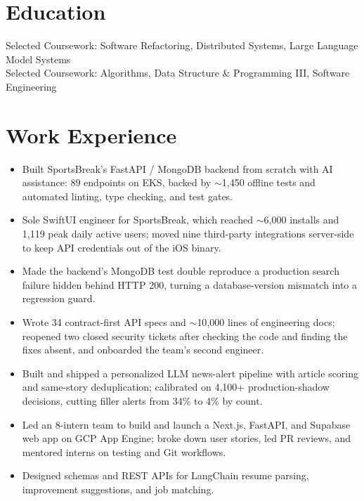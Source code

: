 \documentclass[11pt, letterpaper]{article}
\begin{document}

\section{Education}
Selected Coursework: Software Refactoring, Distributed Systems, Large Language Model Systems\\[1pt]
Selected Coursework: Algorithms, Data Structure \& Programming III, Software Engineering

\section{Work Experience}
\begin{itemize}
  \item Built SportsBreak's FastAPI / MongoDB backend from scratch with AI assistance: 89 endpoints on EKS, backed by $\sim$1{,}450 offline tests and automated linting, type checking, and test gates.
  \item Sole SwiftUI engineer for SportsBreak, which reached $\sim$6{,}000 installs and 1{,}119 peak daily active users; moved nine third-party integrations server-side to keep API credentials out of the iOS binary.
  \item Made the backend's MongoDB test double reproduce a production search failure hidden behind HTTP 200, turning a database-version mismatch into a regression guard.
  \item Wrote 34 contract-first API specs and $\sim$10{,}000 lines of engineering docs; reopened two closed security tickets after checking the code and finding the fixes absent, and onboarded the team's second engineer.
  \item Built and shipped a personalized LLM news-alert pipeline with article scoring and same-story deduplication; calibrated on 4{,}100+ production-shadow decisions, cutting filler alerts from 34\% to 4\% by count.
\end{itemize}

\vspace{1pt}
\begin{itemize}
  \item Led an 8-intern team to build and launch a Next.js, FastAPI, and Supabase web app on GCP App Engine; broke down user stories, led PR reviews, and mentored interns on testing and Git workflows.
  \item Designed schemas and REST APIs for LangChain resume parsing, improvement suggestions, and job matching.
\end{itemize}
\end{document}
